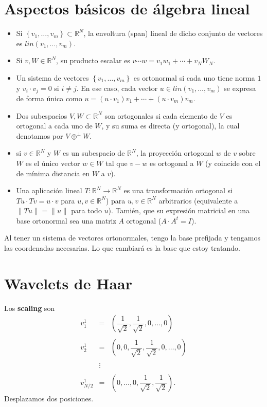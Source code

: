 \section{Aspectos básicos de álgebra lineal}
\begin{itemize}
    \item Si $\left\{v_1,\ldots,v_m\right\}\subset \mathbb{R}^N$, la envoltura (span) lineal de dicho conjunto de vectores es $lin(v_1,\ldots,v_m)$.
    \item Si $v,W\in \mathbb{R}^N$, su producto escalar es $v\cdots w=v_1w_1+\cdots+v_N W_N$.
    \item Un sistema de vectores $\left\{v_1,\ldots,v_m\right\}$ es ortonormal si cada uno tiene norma $1$ y $v_i\cdot v_j=0$ si $i\neq j$. En ese caso, cada vector $u\in lin(v_1,\ldots,v_m)$ se expresa de forma única como $u=(u\cdot v_1)v_1+\cdots+(u\cdot v_m)v_m.$
    \item Dos subespacios $V,W\subset \mathbb{R}^N$ son ortogonales si cada elemento de $V$ es ortogonal a cada uno de $W$, y su suma es directa (y ortogonal), la cual denotamos por $V\oplus^{\perp} W$.
    \item si $v\in \mathbb{R}^N$ y $W$ es un subespacio de $\mathbb{R}^N$, la proyección ortogonal $w$ de $v$ sobre $W$ es el único vector $w\in W$ tal que $v-w$ es ortogonal a $W$ (y coincide con el de mínima distancia en $W$ a $v$).
    \item Una aplicación lineal $T:\mathbb{R}^N\to \mathbb{R}^N$ es una transformación ortogonal si $Tu\cdot Tv=u\cdot v$  para $u,v\in \mathbb{R}^N$) para $u,v\in \mathbb{R}^N$ arbitrarios (equivalente a $\|Tu\|=\|u\|$ para todo $u$). Tamién, que su expresión matricial en una base ortonormal sea una matriz $A$ ortogonal ($A\cdot A^t=I$).
\end{itemize}

Al tener un sistema de vectores ortonormales, tengo la base prefijada y tengamos las coordenadas necesarias. Lo que cambiará es la base que estoy tratando. 

\section{Wavelets de Haar}
Los \textbf{scaling} son
$$
\begin{array}{rcl}
    v_1^1 &=&\left(\dfrac{1}{\sqrt{2}},\dfrac{1}{\sqrt{2}},0,\ldots,0\right)\\\\
    v_2^1 &=& \left(0,0,\dfrac{1}{\sqrt{2}},\dfrac{1}{\sqrt{2}},0,\ldots,0\right)\\\\
    &\vdots&\\\\
    v_{N/2}^1 &=& \left(0,\ldots,0,\dfrac{1}{\sqrt{2}},\dfrac{1}{\sqrt{2}}\right).
\end{array}
$$
Desplazamos dos posiciones.

